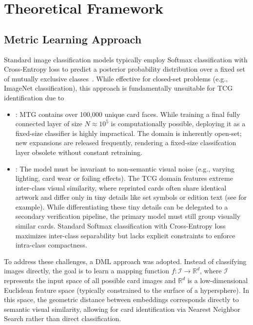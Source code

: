 \section{Theoretical Framework}

\subsection{Metric Learning Approach}
Standard image classification models typically employ Softmax classification with Cross-Entropy loss to predict a posterior probability distribution over a fixed set of mutually exclusive classes~\cite{bishop2006pattern}. While effective for closed-set problems (e.g., ImageNet classification), this approach is fundamentally unsuitable for \ac{TCG} identification due to
\begin{itemize}
    \item {}: \ac{MTG} contains over 100,000 unique card faces. While training a final fully connected layer of size $N \approx 10^5$ is computationally possible, deploying it as a fixed-size classifier is highly impractical. The domain is inherently open-set; new expansions are released frequently, rendering a fixed-size classifcation layer obsolete without constant retraining.
    \item {}: The model must be invariant to non-semantic visual noise (e.g., varying lighting, card wear or foiling effects). The \ac{TCG} domain features extreme inter-class visual similarity, where reprinted cards often share identical artwork and differ only in tiny details like set symbols or edition text (see  for example). While differentiating these tiny details can be delegated to a secondary verification pipeline, the primary model must still group visually similar cards. Standard Softmax classification with Cross-Entropy loss maximizes inter-class separability but lacks explicit constraints to enforce intra-class compactness.
\end{itemize}
To address these challenges, a \ac{DML} approach was adopted. Instead of classifying images directly, the goal is to learn a mapping function $f: \mathcal{I} \rightarrow \mathbb{R}^d$, where $\mathcal{I}$ represents the input space of all possible card images and $\mathbb{R}^d$ is a low-dimensional Euclidean feature space (typically constrained to the surface of a hypersphere). In this space, the geometric distance between embeddings corresponds directly to semantic visual similarity, allowing for card identification via Nearest Neighbor Search rather than direct classification.

